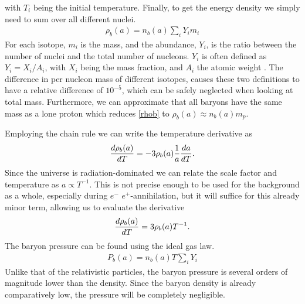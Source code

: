 with $T_i$ being the initial temperature. Finally, to get the energy density we simply need to sum over all different nuclei. 
\begin{align}
    \rho_b(a)=n_b(a)\sum_{i}^{}Y_i m_i
    \label{rhob}
\end{align}
For each isotope, $m_i$ is the mass, and the abundance, $Y_i$, is the ratio between the number of nuclei and the total number of nucleons. $Y_i$ is often defined as $Y_i=X_i/A_i$, with $X_i$ being the mass fraction, and $A_i$ the atomic weight \cite{Wagoner69}. The difference in per nucleon mass of different isotopes, causes these two definitions to have a relative difference of $10^{-5}$, which can be safely neglected when looking at total mass. Furthermore, we can approximate that all baryons have the same mass as a lone proton which reduces \eqref{rhob} to $\rho_b(a) \approx n_b(a)m_p$. 

Employing the chain rule we can write the temperature derivative as 
\begin{align}
    \frac{d\rho_b(a)}{dT} = -3\rho_b(a)\frac{1}{a}\frac{da}{dT}.
\end{align}
Since the universe is radiation-dominated we can relate the scale factor and temperature as $a\propto T^{-1}$. This is not precise enough to be used for the background as a whole, especially during $e^-$ $e^+$-annihilation, but it will suffice for this already minor term, allowing us to evaluate the derivative
\begin{align}
    \frac{d\rho_b(a)}{dT} = 3\rho_b(a)T^{-1}.
    \label{drhob}
\end{align}
The baryon pressure can be found using the ideal gas law.
\begin{align}
    P_b(a)= n_b(a)T\sum_{i}^{}Y_i
\end{align}
Unlike that of the relativistic particles, the baryon pressure is several orders of magnitude lower than the density. Since the baryon density is already comparatively low, the pressure will be completely negligible.




